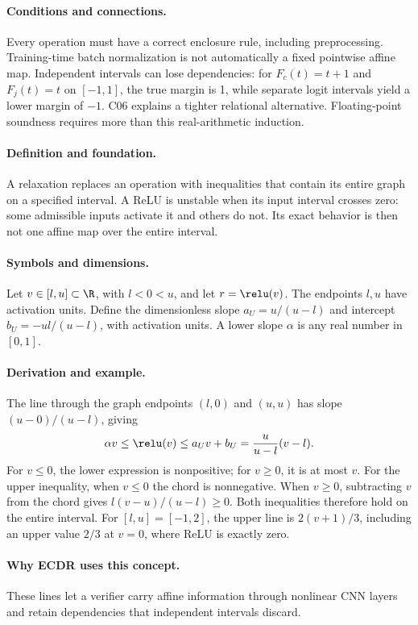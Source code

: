 \paragraph{Conditions and connections.}
Every operation must have a correct enclosure rule, including preprocessing. Training-time batch normalization is not automatically a fixed pointwise affine map. Independent intervals can lose dependencies: for $F_c(t)=t+1$ and $F_j(t)=t$ on $[-1,1]$, the true margin is 1, while separate logit intervals yield a lower margin of $-1$. C06 explains a tighter relational alternative. Floating-point soundness requires more than this real-arithmetic induction.

\paragraph{Definition and foundation.}
A relaxation replaces an operation with inequalities that contain its entire graph on a specified interval. A ReLU is unstable when its input interval crosses zero: some admissible inputs activate it and others do not. Its exact behavior is then not one affine map over the entire interval.
\paragraph{Symbols and dimensions.}
Let $v\in[l,u]\subset\R$, with $l<0<u$, and let $r=\relu(v)$. The endpoints $l,u$ have activation units. Define the dimensionless slope $a_U=u/(u-l)$ and intercept $b_U=-ul/(u-l)$, with activation units. A lower slope $\alpha$ is any real number in $[0,1]$.
\paragraph{Derivation and example.}
The line through the graph endpoints $(l,0)$ and $(u,u)$ has slope $(u-0)/(u-l)$, giving
\[
 \alpha v\le\relu(v)\le a_Uv+b_U
 =\frac{u}{u-l}(v-l).
\]
For $v\le0$, the lower expression is nonpositive; for $v\ge0$, it is at most $v$. For the upper inequality, when $v\le0$ the chord is nonnegative. When $v\ge0$, subtracting $v$ from the chord gives $l(v-u)/(u-l)\ge0$. Both inequalities therefore hold on the entire interval.
For $[l,u]=[-1,2]$, the upper line is $2(v+1)/3$, including an upper value $2/3$ at $v=0$, where ReLU is exactly zero.
\paragraph{Why ECDR uses this concept.}
These lines let a verifier carry affine information through nonlinear CNN layers and retain dependencies that independent intervals discard.

